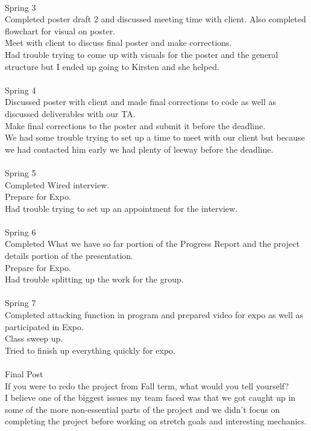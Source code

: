 \documentclass[10pt,letterpaper,onecolumn,draftclsnofoot]{IEEEtran}
\begin{document}
\\
Spring 3\\
Completed poster draft 2 and discussed meeting time with client. Also completed flowchart for visual on poster.\\ Meet with client to discuss final poster and make corrections.\\ Had trouble trying to come up with visuals for the poster and the general structure but I ended up going to Kirsten and she helped.\\
\\
Spring 4\\
Discussed poster with client and made final corrections to code as well as discussed deliverables with our TA.\\ Make final corrections to the poster and submit it before the deadline.\\ We had some trouble trying to set up a time to meet with our client but because we had contacted him early we had plenty of leeway before the deadline.\\
\\
Spring 5\\
Completed Wired interview.\\ Prepare for Expo.\\ Had trouble trying to set up an appointment for the interview.\\
\\
Spring 6\\
Completed What we have so far portion of the Progress Report and the project details portion of the presentation.\\ Prepare for Expo.\\ Had trouble splitting up the work for the group.\\
\\
Spring 7\\
Completed attacking function in program and prepared video for expo as well as participated in Expo.\\ Class sweep up.\\ Tried to finish up everything quickly for expo.\\
\\
Final Post\\
If you were to redo the project from Fall term, what would you tell yourself?\\
I believe one of the biggest issues my team faced was that we got caught up in some of the more non-essential parts of the project and we didn't focus on completing the project before working on stretch goals and interesting mechanics.\\
\end{document}
